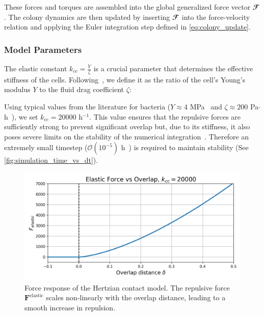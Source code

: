 \documentclass[conference]{IEEEtran}
\begin{document}
These forces and torques are assembled into the global generalized force vector $\mathbfcal{F}$. The colony dynamics are then updated by inserting $\mathbfcal{F}$ into the force-velocity relation and applying the Euler integration step defined in \autoref{eq:colony_update}.

\subsubsection{Model Parameters}

The elastic constant $k_{cc} = \frac{Y}{\zeta}$ is a crucial parameter that determines the effective stiffness of the cells. Following~\cite{You2018}, we define it as the ratio of the cell's Young's modulus $Y$ to the fluid drag coefficient $\zeta$:

Using typical values from the literature for bacteria ($Y \approx 4$ MPa~\cite{You2018, Blanchard2015} and $\zeta \approx 200$ Pa$\cdot$h~\cite{You2018}), we set $k_{cc} = 20000$ h$^{-1}$. This value ensures that the repulsive forces are sufficiently strong to prevent significant overlap but, due to its stiffness, it also poses severe limits on the stability of the numerical integration~\cite{Yan2022}. Therefore an extremely small timestep ($\mathcal{O}(10^{-5})$ h~\cite{Khan_2024, You2018, Blanchard2015}) is required to maintain stability (See \autoref{fig:simulation_time_vs_dt}).

\begin{figure}[H]
    \centering
    \includegraphics[width=\linewidth]{figures/hertzian_contact_model.png}
    \caption{Force response of the Hertzian contact model. The repulsive force $\mathbf{F}^{\text{elastic}}$ scales non-linearly with the overlap distance, leading to a smooth increase in repulsion.}
    \label{fig:hertzian_contact_model}
\end{figure}
\end{document}
